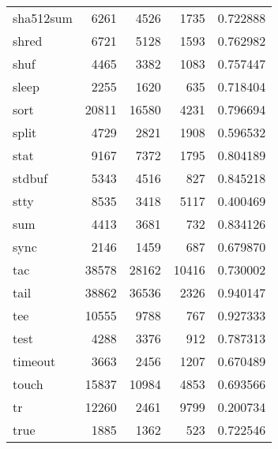 \begin{longtable}{lrrrr}
sha512sum &                     6261 &         4526 &          1735 &                 0.722888 \\
shred     &                     6721 &         5128 &          1593 &                 0.762982 \\
shuf      &                     4465 &         3382 &          1083 &                 0.757447 \\
sleep     &                     2255 &         1620 &           635 &                 0.718404 \\
sort      &                    20811 &        16580 &          4231 &                 0.796694 \\
split     &                     4729 &         2821 &          1908 &                 0.596532 \\
stat      &                     9167 &         7372 &          1795 &                 0.804189 \\
stdbuf    &                     5343 &         4516 &           827 &                 0.845218 \\
stty      &                     8535 &         3418 &          5117 &                 0.400469 \\
sum       &                     4413 &         3681 &           732 &                 0.834126 \\
sync      &                     2146 &         1459 &           687 &                 0.679870 \\
tac       &                    38578 &        28162 &         10416 &                 0.730002 \\
tail      &                    38862 &        36536 &          2326 &                 0.940147 \\
tee       &                    10555 &         9788 &           767 &                 0.927333 \\
test      &                     4288 &         3376 &           912 &                 0.787313 \\
timeout   &                     3663 &         2456 &          1207 &                 0.670489 \\
touch     &                    15837 &        10984 &          4853 &                 0.693566 \\
tr        &                    12260 &         2461 &          9799 &                 0.200734 \\
true      &                     1885 &         1362 &           523 &                 0.722546 \\

\end{longtable}
